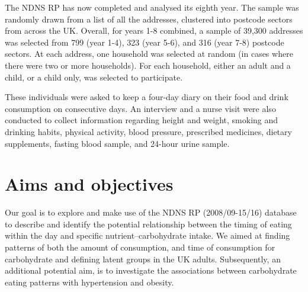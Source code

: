 The NDNS RP has now completed and analysed its eighth year. The sample was randomly drawn from a list of all the addresses, clustered into postcode sectors from across the UK. Overall, for years 1-8 combined, a sample of 39,300 addresses was selected from 799 (year 1-4), 323 (year 5-6), and 316 (year 7-8) postcode sectors. At each address, one household was selected at random (in cases where there were two or more households). For each household, either an adult and a child, or a child only, was selected to participate. 

These individuals were asked to keep a four-day diary on their food and drink consumption on consecutive days. An interview and a nurse visit were also conducted to collect information regarding height and weight, smoking and drinking habits, physical activity, blood pressure, prescribed medicines, dietary supplements, fasting blood sample, and 24-hour urine sample. \vspace{-0.3cm}

\section{Aims and objectives}\vspace{-0.3cm}


Our goal is to explore and make use of the NDNS RP (2008/09-15/16) database to describe and identify the potential relationship between the timing of eating within the day and specific nutrient--carbohydrate intake. We aimed at finding patterns of both the amount of consumption, and time of consumption for carbohydrate and defining latent groups in the UK adults. Subsequently, an additional potential aim, is to investigate the associations between carbohydrate eating patterns with hypertension and obesity.

